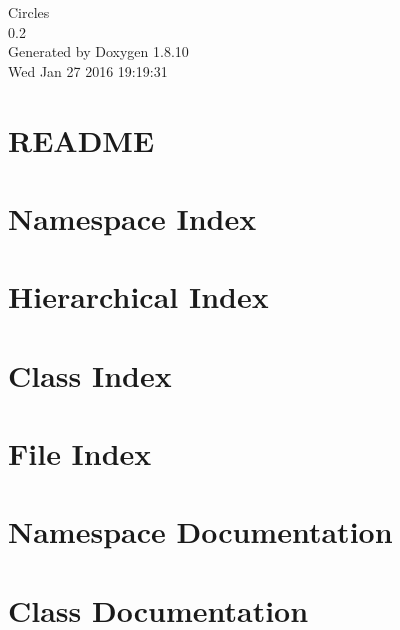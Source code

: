 \documentclass[twoside]{book}
\newcommand{\+}{\discretionary{\mbox{\scriptsize$\hookleftarrow$}}{}{}}
\newcommand{\clearemptydoublepage}{%
  \newpage{\pagestyle{empty}\cleardoublepage}%
}
\begin{document}
\hypersetup{pageanchor=false,
             bookmarks=true,
             bookmarksnumbered=true,
             pdfencoding=unicode
            }
\begin{titlepage}
\vspace*{7cm}
\begin{center}%
{\Large Circles \\[1ex]\large 0.\+2 }\\
\vspace*{1cm}
{\large Generated by Doxygen 1.8.10}\\
\vspace*{0.5cm}
{\small Wed Jan 27 2016 19:19:31}\\
\end{center}
\end{titlepage}
\clearemptydoublepage
\tableofcontents
\clearemptydoublepage
{}
\hypersetup{pageanchor=true}

\chapter{R\+E\+A\+D\+M\+E}
\label{md__r_e_a_d_m_e}
\hypertarget{md__r_e_a_d_m_e}{}

\chapter{Namespace Index}

\chapter{Hierarchical Index}

\chapter{Class Index}

\chapter{File Index}

\chapter{Namespace Documentation}




\chapter{Class Documentation}




















\end{document}
